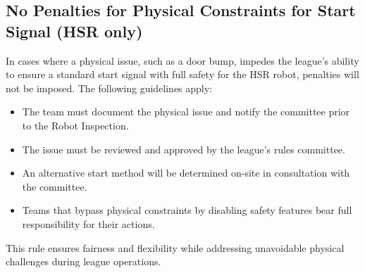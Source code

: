 \subsection{No Penalties for Physical Constraints for Start Signal (HSR only)}

In cases where a physical issue, such as a door bump, impedes the league's ability to ensure a standard start signal with full safety for the HSR robot, penalties will not be imposed. The following guidelines apply:
\begin{itemize}
    \item The team must document the physical issue and notify the committee prior to the Robot Inspection.
    \item The issue must be reviewed and approved by the league's rules committee.
    \item An alternative start method will be determined on-site in consultation with the committee.
    \item Teams that bypass physical constraints by disabling safety features bear full responsibility for their actions.
\end{itemize}
This rule ensures fairness and flexibility while addressing unavoidable physical challenges during league operations.

